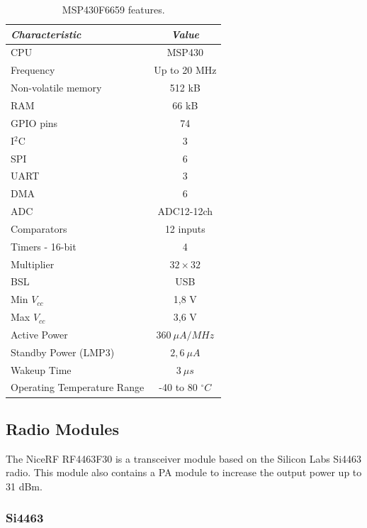 \documentclass[12pt]{book}
\begin{document}
\begin{table}[!h]
	\begin{center}
		\begin{tabular}{lc}
			\toprule[1.5pt]
			\textit{Characteristic} & \textit{Value} \\
			\midrule
			CPU & MSP430 \\
			Frequency & Up to 20 MHz \\
			Non-volatile memory & 512 kB \\
			RAM & 66 kB \\
			GPIO pins & 74 \\
			I$^{2}$C & 3 \\
			SPI & 6 \\
			UART & 3 \\
			DMA & 6 \\
			ADC & ADC12-12ch \\
			Comparators & 12 inputs \\
			Timers - 16-bit & 4 \\
			Multiplier & $32 \times 32$ \\
			BSL & USB \\
			Min $V_{cc}$ & 1,8 V \\
			Max $V_{cc}$ & 3,6 V \\
			Active Power & $360\ \mu A/MHz$ \\
			Standby Power (LMP3) & $2,6\ \mu A$ \\
			Wakeup Time & $3\ \mu s$ \\
			Operating Temperature Range & -40 to 80 $^{\circ}C$ \\
			\bottomrule[1.5pt]
		\end{tabular}
		\caption{MSP430F6659 features.}
		\label{tab:msp430f6659-info}
	\end{center}
\end{table}

\subsection{Radio Modules}

The NiceRF RF4463F30 \cite{rf4463f30} is a transceiver module based on the Silicon Labs Si4463 \cite{si4463} radio. This module also contains a PA module to increase the output power up to 31 dBm.

\subsubsection{Si4463}
\end{document}
